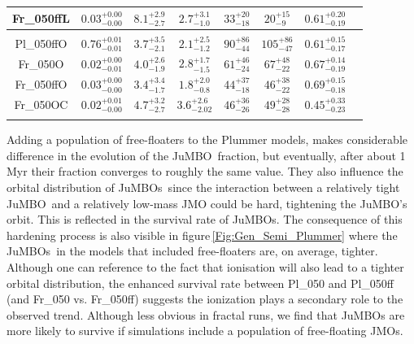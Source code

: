 \documentclass[submission,phys]{lib/SciPost}
\newcommand{\jumbo}{\mbox{JuMBO}}
\newcommand{\jumbos}{\mbox{JuMBOs}}
\begin{document}
\begin{table}
\begin{tabular}{c c c c c c c c}
           Fr\_050ffL  & $0.03^{+0.00}_{-0.00}$ & $8.1^{+2.9}_{-2.7}$ & $2.7^{+3.1}_{-1.0}$ & $33^{+20}_{-18}$ & $20^{+15}_{-9}$ & $0.61^{+0.20}_{-0.19}$ \vspace{0.25em}\\
           \hline \vspace{-0.75em}\\
           Pl\_050ffO  & $0.76^{+0.01}_{-0.01}$ & $3.7^{+3.5}_{-2.1}$ & $2.1^{+2.5}_{-1.2}$ & $90^{+86}_{-44}$ & $105^{+86}_{-47}$ & $0.61^{+0.15}_{-0.17}$ \vspace{0.25em}\\
           Fr\_050O    & $0.02^{+0.00}_{-0.01}$ & $4.0^{+2.6}_{-1.9}$ & $2.8^{+1.7}_{-1.5}$ & $61^{+46}_{-24}$ & $67^{+48}_{-22}$ & $0.67^{+0.14}_{-0.19}$ \vspace{0.25em}\\
           Fr\_050ffO  & $0.03^{+0.00}_{-0.00}$ & $3.4^{+3.4}_{-1.7}$ & $1.8^{+2.0}_{-0.8}$ & $44^{+37}_{-18}$ & $46^{+38}_{-22}$ & $0.69^{+0.15}_{-0.18}$ \vspace{0.25em}\\
           Fr\_050OC   & $0.02^{+0.01}_{-0.00}$ & $4.7^{+3.2}_{-2.7}$ & $3.6^{+2.6}_{-2.02}$ & $46^{+36}_{-26}$ & $49^{+28}_{-28}$ & $0.45^{+0.33}_{-0.23}$ \vspace{0.25em}\\
           \hline
         \hline                                   %
         \label{Tab:Final_ISF_FFC_Results}
        \end{tabular}
     \end{table}

Adding a population of free-floaters to the Plummer models, makes
considerable difference in the evolution of the \jumbo\, fraction, but
eventually, after about 1\,Myr their fraction converges to roughly the
same value.  They also influence the orbital distribution of \jumbos\,
since the interaction between a relatively tight \jumbo\, and a
relatively low-mass JMO could be hard, tightening the \jumbo's
orbit. This is reflected in the survival rate of \jumbos. The
consequence of this hardening process is also visible in
figure\,\ref{Fig:Gen_Semi_Plummer} where the \jumbos\, in the models
that included free-floaters are, on average, tighter. Although one can
reference to the fact that ionisation will also lead to a tighter
orbital distribution, the enhanced survival rate between Pl\_050 and
Pl\_050ff (and Fr\_050 vs.  Fr\_050ff) suggests the ionization plays a
secondary role to the observed trend.  Although less obvious in
fractal runs, we find that JuMBOs are more likely to survive if
simulations include a population of free-floating JMOs.
\end{document}
